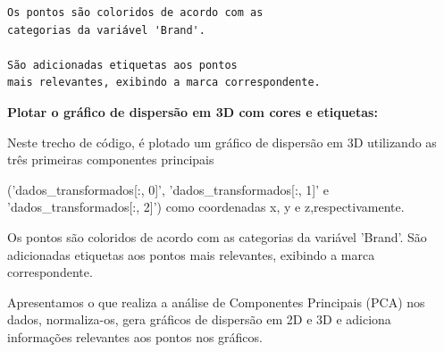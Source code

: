 \documentclass[12pt, a4paper]{article}
\begin{document}
\begin{enumerate}
\begin{verbatim}
Os pontos são coloridos de acordo com as 
categorias da variável 'Brand'.

São adicionadas etiquetas aos pontos 
mais relevantes, exibindo a marca correspondente.

\end{verbatim}

\textbf{Plotar o gráfico de dispersão em 3D com cores e etiquetas:}


Neste trecho de código, é plotado um gráfico de dispersão em 3D utilizando as três primeiras componentes principais 

('dados_transformados[:, 0]', 'dados_transformados[:, 1]' e 'dados_transformados[:, 2]') como coordenadas x, y e z,respectivamente.

Os pontos são coloridos de acordo com as categorias da variável 'Brand'.
São adicionadas etiquetas aos pontos mais relevantes, exibindo a marca correspondente.

Apresentamos o que realiza a análise de Componentes Principais (PCA) nos dados, normaliza-os, gera gráficos de dispersão em 2D e 3D e adiciona informações relevantes aos pontos nos gráficos.




\end{enumerate}
\end{document}
